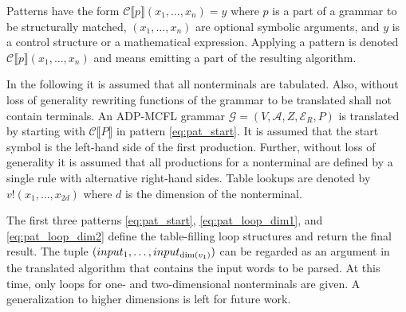\documentclass[
    a4paper,
    12pt,
    twoside,
    BCOR=12mm,
    parskip=half,
    chapterprefix,
    numbers=noenddot,
    bibliography=totoc
]{scrbook}
\begin{document}
Patterns have the form $\mathcal{C}\llbracket p \rrbracket(x_1,\ldots,x_n) = y$ where $p$ is a part of a grammar to be structurally matched, $(x_1,\ldots,x_n)$ are optional symbolic arguments, and $y$ is a control structure or a mathematical expression. Applying a pattern is denoted $\mathcal{C}\llbracket p \rrbracket(x_1,\ldots,x_n)$ and means emitting a part of the resulting algorithm.

In the following it is assumed that all nonterminals are tabulated. Also, without loss of generality rewriting functions of the grammar to be translated shall not contain terminals.  An \gls{ADP-MCFL} grammar $\mathcal{G}=(V,\mathcal{A},Z,\mathcal{E}_R,P)$ is translated by starting with $\mathcal{C}\llbracket P \rrbracket$ in pattern \ref{eq:pat_start}. It is assumed that the start symbol is the left-hand side of the first production. Further, without loss of generality it is assumed that all productions for a nonterminal are defined by a single rule with alternative right-hand sides. Table lookups are denoted by $v!(x_1,\ldots,x_{2d})$ where $d$ is the dimension of the nonterminal.

The first three patterns \ref{eq:pat_start}, \ref{eq:pat_loop_dim1}, and \ref{eq:pat_loop_dim2} define the table-filling loop structures and return the final result. The tuple $(input_1,\ldots,input_{\mathrm{dim}(v_1)})$ can be regarded as an argument in the translated algorithm that contains the input words to be parsed. At this time, only loops for one- and two-dimensional nonterminals are given. A generalization to higher dimensions is left for future work.
\end{document}
